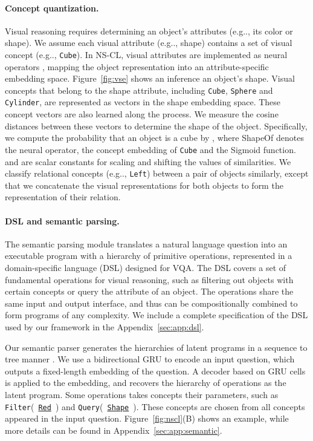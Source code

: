 \documentclass{article} \usepackage{iclr2019_conference,times}
\makeatletter
\newcommand{\fig}[1]{Figure~\ref{#1}}
\DeclareRobustCommand\onedot{\futurelet\@let@token\@onedot}
\def\@onedot{\ifx\@let@token.\else.\null\fi\xspace}
\def\eg{e.g\onedot} \def\Eg{E.g\onedot}
\newcommand{\model}{NS-CL\xspace}
\newcommand{\myparagraph}[1]{\vspace{-3pt}\paragraph{#1}}
\makeatother
\begin{document}
\myparagraph{Concept quantization.}
Visual reasoning requires determining an object's attributes (\eg, its color or shape). We assume each visual attribute (\eg, shape) contains a set of visual concept (\eg, \texttt{Cube}). In \model, visual attributes are implemented as neural operators
, mapping the object representation into an attribute-specific embedding space. \fig{fig:vse} shows an inference an object's shape. Visual concepts that belong to the shape attribute, including \texttt{Cube}, \texttt{Sphere} and \texttt{Cylinder}, are represented as vectors in the shape embedding space. These concept vectors are also learned along the process. We measure the cosine distances  between these vectors to determine the shape of the object. Specifically, we compute the probability that an object  is a cube by
,
where ShapeOf denotes the neural operator,  the concept embedding of \texttt{Cube} and  the Sigmoid function.  and  are scalar constants for scaling and shifting the values of similarities. We classify relational concepts (\eg, \texttt{Left}) between a pair of objects similarly, except that we concatenate the visual representations for both objects to form the representation of their relation.

\myparagraph{DSL and semantic parsing.}

The semantic parsing module translates a natural language question into an executable program with a hierarchy of primitive operations, represented in a domain-specific language (DSL) designed for VQA. The DSL covers a set of fundamental operations for visual reasoning, such as filtering out objects with certain concepts or query the attribute of an object. The operations share the same input and output interface, and thus can be compositionally combined to form programs of any complexity. We include a complete specification of the DSL used by our framework in the Appendix~\ref{sec:app:dsl}.

Our semantic parser generates the hierarchies of latent programs in a sequence to tree manner \citep{Dong2016Language}. We use a bidirectional GRU \citep{Cho2014Learning} to encode an input question, which outputs a fixed-length embedding of the question. A decoder based on GRU cells is applied to the embedding, and recovers the hierarchy of operations as the latent program. Some operations takes concepts their parameters, such as \texttt{Filter}(~\underline{\texttt{Red}}~) and \texttt{Query}(~\underline{\texttt{Shape}}~). These concepts are chosen from all concepts appeared in the input question. \fig{fig:nscl}(B) shows an example, while more details can be found in Appendix~\ref{sec:app:semantic}.
\end{document}
